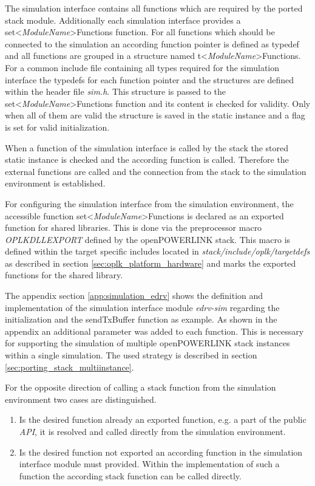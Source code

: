 \begin{sloppypar}
The simulation interface contains all functions which are required by the ported stack module.
Additionally each simulation interface provides a set<\emph{ModuleName}>Functions function.
For all functions which should be connected to the simulation an according function pointer is defined as typedef and all functions are grouped in a structure named t<\emph{ModuleName}>Functions.
For a common include file containing all types required for the simulation interface the typedefs for each function pointer and the structures are defined within the header file \emph{sim.h}.
This structure is passed to the set<\emph{ModuleName}>Functions function and its content is checked for validity.
Only when all of them are valid the structure is saved in the static instance and a flag is set for valid initialization.
\end{sloppypar}

When a function of the simulation interface is called by the stack the stored static instance is checked and the according function is called.
Therefore the external functions are called and the connection from the stack to the simulation environment is established.

For configuring the simulation interface from the simulation environment, the accessible function set<\emph{ModuleName}>Functions is declared as an exported function for shared libraries.
This is done via the preprocessor macro \emph{OPLKDLLEXPORT} defined by the openPOWERLINK stack.
This macro is defined within the target specific includes located in \emph{stack/include/oplk/targetdefs} as described in section \ref{sec:oplk_platform_hardware} and marks the exported functions for the shared library.

The appendix section \ref{app:simulation_edrv} shows the definition and implementation of the simulation interface module \emph{edrv-sim} regarding the initialization and the sendTxBuffer function as example.
As shown in the appendix an additional parameter was added to each function.
This is necessary for supporting the simulation of multiple openPOWERLINK stack instances within a single simulation.
The used strategy is described in section \ref{sec:porting_stack_multiinstance}.

For the opposite direction of calling a stack function from the simulation environment two cases are distinguished.

\begin{enumerate}
    \item Is the desired function already an exported function, e.g. a part of the public \emph{API}, it is resolved and called directly from the simulation environment.
    \item Is the desired function not exported an according function in the simulation interface module must provided.
    Within the implementation of such a function the according stack function can be called directly.
\end{enumerate}

